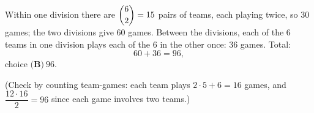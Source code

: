 Within one division there are $\dbinom62=15$ pairs of teams, each playing twice, so $30$ games; the two divisions give $60$ games. Between the divisions, each of the $6$ teams in one division plays each of the $6$ in the other once: $36$ games. Total:
\[
60+36=96,
\]
choice $\boxed{\textbf{(B)}\ 96}$.

(Check by counting team-games: each team plays $2\cdot5+6=16$ games, and $\dfrac{12\cdot16}{2}=96$ since each game involves two teams.)

